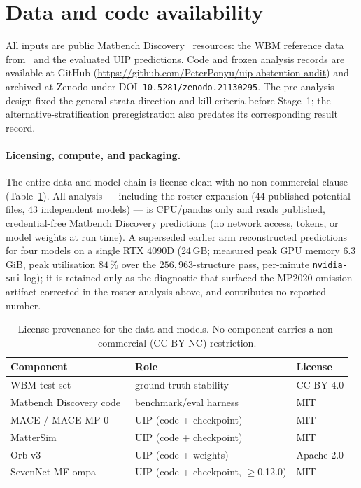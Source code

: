 \documentclass[11pt]{article}
\begin{document}
\section*{Data and code availability}

All inputs are public Matbench Discovery~\citep{riebesell2025} resources: the WBM reference data from~\citep{wang2021} and the evaluated UIP predictions. Code and frozen analysis records are available at GitHub (\url{https://github.com/PeterPonyu/uip-abstention-audit}) and archived at Zenodo under DOI~\texttt{10.5281/zenodo.21130295}. The pre-analysis design fixed the general strata direction and kill criteria before Stage~1; the alternative-stratification preregistration also predates its corresponding result record.
\paragraph{Licensing, compute, and packaging.} The entire data-and-model chain is
license-clean with no non-commercial clause (Table~\ref{tab:licenses}). All analysis --- including
the roster expansion ($44$ published-potential files, $43$ independent models) --- is CPU/pandas
only and reads published,
credential-free Matbench Discovery predictions (no network access, tokens, or model weights at run
time). A superseded earlier arm reconstructed predictions for four models on a single RTX 4090D (24\,GB; measured
peak GPU memory $6.3$\,GiB, peak utilisation $84\,\%$ over the $256{,}963$-structure pass, per-minute
\texttt{nvidia-smi} log); it is retained only as the diagnostic that surfaced the MP2020-omission
artifact corrected in the roster analysis above, and contributes no reported number.

\begin{table}[t]
  \centering
  \caption{License provenance for the data and models. No component carries a
  non-commercial (CC-BY-NC) restriction.}
  \label{tab:licenses}
  \begin{tabular}{lll}
    \toprule
    Component & Role & License \\
    \midrule
    WBM test set~\citep{wang2021}          & ground-truth stability & CC-BY-4.0 \\
    Matbench Discovery code~\citep{riebesell2025} & benchmark/eval harness & MIT \\
    MACE / MACE-MP-0~\citep{batatia2022mace} & UIP (code + checkpoint) & MIT \\
    MatterSim~\citep{yang2024mattersim}     & UIP (code + checkpoint) & MIT \\
    Orb-v3~\citep{rhodes2025orbv3}          & UIP (code + weights)   & Apache-2.0 \\
    SevenNet-MF-ompa~\citep{park2024sevennet,sevennet} & UIP (code + checkpoint, $\ge$0.12.0) & MIT \\
    \bottomrule
  \end{tabular}
\end{table}
\end{document}
